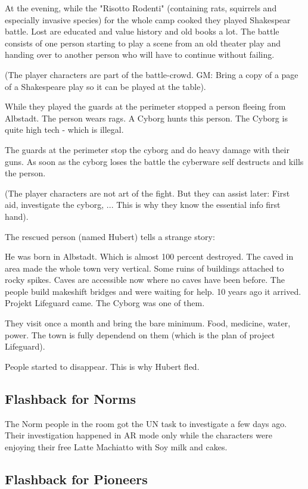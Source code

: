 At the evening, while the "Risotto Rodenti" (containing rats, squirrels and especially invasive species) for the whole camp cooked they played Shakespear battle. Lost are educated and value history and old books a lot. The battle consists of one person starting to play a scene from an old theater play and handing over to another person who will have to continue without failing.

(The player characters are part of the battle-crowd. GM: Bring a copy of a page of a Shakespeare play so it can be played at the table).

While they played the guards at the perimeter stopped a person fleeing from Albstadt. The person wears rags. A Cyborg hunts this person. The Cyborg is quite high tech - which is illegal.

The guards at the perimeter stop the cyborg and do heavy damage with their guns. As soon as the cyborg loses the battle the cyberware self destructs and kills the person.

(The player characters are not art of the fight. But they can assist later: First aid, investigate the cyborg, ... This is why they know the essential info first hand).

The rescued person (named Hubert) tells a strange story:

He was born in Albstadt. Which is almost 100 percent destroyed. The caved in area made the whole town very vertical. Some ruins of buildings attached to rocky spikes. Caves are accessible now where no caves have been before. The people build makeshift bridges and were waiting for help. 10 years ago it arrived. Projekt Lifeguard came. The Cyborg was one of them.

They visit once a month and bring the bare minimum. Food, medicine, water, power. The town is fully dependend on them (which is the plan of project Lifeguard).

People started to disappear. This is why Hubert fled.

\subsection{Flashback for Norms}

The Norm people in the room got the UN task to investigate a few days ago. Their investigation happened in AR mode only while the characters were enjoying their free Latte Machiatto with Soy milk and cakes.



\subsection{Flashback for Pioneers}

